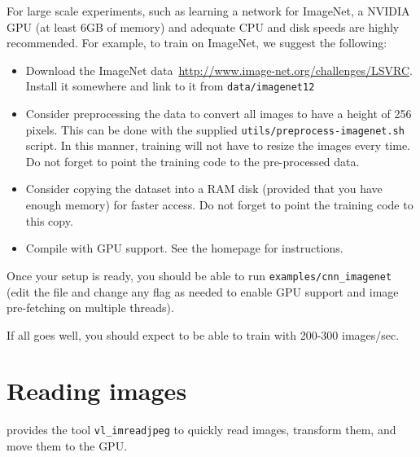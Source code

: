 For large scale experiments, such as learning a network for ImageNet, a NVIDIA GPU (at least 6GB of memory) and adequate CPU and disk speeds are highly recommended. For example, to train on ImageNet, we suggest the following:
\begin{itemize}
\item Download the ImageNet data~\url{http://www.image-net.org/challenges/LSVRC}. Install it somewhere and link to it from \verb!data/imagenet12!
\item Consider preprocessing the data to convert all images to have a height of 256 pixels. This can be done with the supplied \verb!utils/preprocess-imagenet.sh! script. In this manner, training will not have to resize the images every time. Do not forget to point the training code to the pre-processed data.
\item Consider copying the dataset into a RAM disk (provided that you have enough memory) for faster access. Do not forget to point the training code to this copy.
\item Compile \matconvnet with GPU support. See the homepage for instructions.
\end{itemize}

Once your setup is ready, you should be able to run \verb!examples/cnn_imagenet! (edit the file and change any flag as needed to enable GPU support and image pre-fetching on multiple threads).

If all goes well, you should expect to be able to train with 200-300 images/sec.


\section{Reading images}

\matconvnet provides the tool \verb!vl_imreadjpeg! to quickly read images, transform them, and move them to the GPU.

